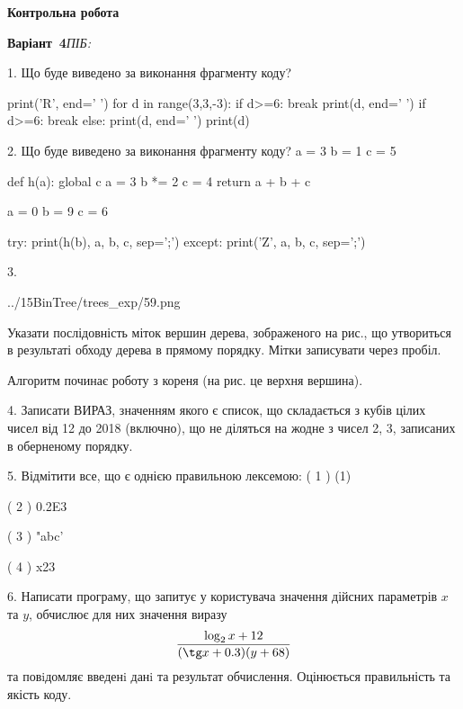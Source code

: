 \documentclass[11pt]{article}
\begin{document}
{\large\textbf{Контрольна робота}}

\textbf{Варіант \No\,4}\hfill \textit{ПІБ:}\,\underline{\hspace{60mm}}
\vspace{4mm}

1. Що буде виведено за виконання фрагменту коду?

print('R', end=' ')
for d in range(3,3,-3):
    if d>=6:
        break
        print(d, end=' ')
    if d>=6:
        break
    else:
        print(d, end=' ')
    print(d)
\vspace{5mm}

2. Що буде виведено за виконання фрагменту коду?
a = 3
b = 1
c = 5

def h(a):
global c    a = 3
    b *= 2
    c = 4
    return a + b + c

a = 0
b = 9
c = 6

try:
    print(h(b), a, b, c, sep=';')
except:
    print('Z', a, b, c, sep=';')
\vspace{5mm}

3. 

\begin{center}
	{../15BinTree/trees_exp/59.png}
\end{center}
Указати послідовність міток вершин дерева, зображеного на рис., що утвориться в результаті обходу дерева в прямому порядку. Мітки записувати через пробіл.\par Алгоритм починає роботу з кореня (на рис. це верхня вершина).
\vspace{5mm}

4. 
Записати ВИРАЗ, значенням якого є список, що складається з кубів цілих чисел від 12 до 2018 (включно), що не діляться на жодне з чисел 2, 3, записаних в оберненому порядку.\vspace{5mm}

5. %
Відмітити все, що є однією правильною лексемою:
( 1 ) (1)

( 2 ) 0.2E3

( 3 ) "abc'

( 4 ) x23
\vspace{5mm}

6. 
Написати програму, що запитує у користувача значення дійсних параметрів $x$ та $y$, обчислює для них значення виразу 
$$\frac{\log_{2} x + 12}{(\tg x + 0.3) (y + 68)}$$ 
та повiдомляє введенi данi та результат обчислення.
 Оцінюється правильність та якість коду.
\end{document}
